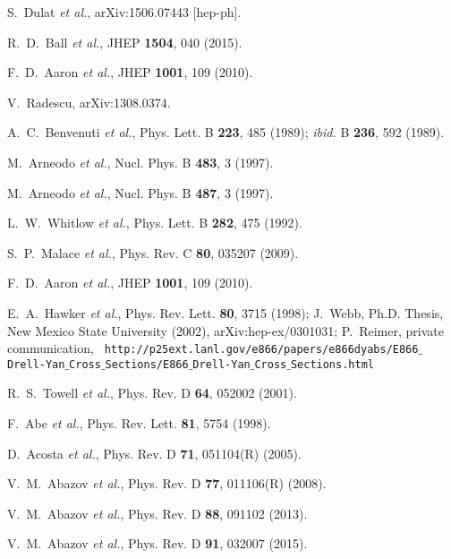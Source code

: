 \documentclass[aps,prd,amsmath,preprint]{revtex4}
\begin{document}
\begin{thebibliography}{99}
S.~Dulat {\it et al.},
arXiv:1506.07443 [hep-ph].

%

R.~D.~Ball {\it et al.},
JHEP {\bf 1504}, 040 (2015).

F.~D.~Aaron {\it et al.},
JHEP {\bf 1001}, 109 (2010).

V.~Radescu, arXiv:1308.0374.

A.~C.~Benvenuti {\it et al.},
Phys. Lett. B {\bf 223}, 485 (1989);
{\it ibid.} B {\bf 236}, 592 (1989).
           
M.~Arneodo {\it et al.},
Nucl. Phys. B {\bf 483}, 3 (1997).

M.~Arneodo {\it et al.},
Nucl. Phys. B {\bf 487}, 3 (1997).

L.~W.~Whitlow {\it et al.},
Phys. Lett. B {\bf 282}, 475 (1992).

S.~P.~Malace {\it et al.},
Phys. Rev. C {\bf 80}, 035207 (2009).

F.~D.~Aaron {\it et al.},
JHEP {\bf 1001}, 109 (2010).

E.~A.~Hawker {\it et al.},
Phys. Rev. Lett. {\bf 80}, 3715 (1998);
%
J.~Webb,
Ph.D. Thesis, New Mexico State University (2002),
arXiv:hep-ex/0301031;
% 
P.~Reimer,
private communication,
%
{\tt
http://p25ext.lanl.gov/e866/papers/e866dyabs/E866$\_$Drell-Yan$\_$Cross$\_$Sections/E866$\_$Drell-Yan$\_$Cross$\_$Sections.html}

R.~S.~Towell {\it et al.},
Phys. Rev. D {\bf 64}, 052002 (2001).

F.~Abe {\it et al.},
Phys. Rev. Lett. {\bf 81}, 5754 (1998).    

D.~Acosta {\it et al.},
Phys. Rev. D {\bf 71}, 051104(R) (2005).

V.~M.~Abazov {\it et al.},
Phys. Rev. D {\bf 77}, 011106(R) (2008).

V.~M.~Abazov {\it et al.},
Phys. Rev. D {\bf 88}, 091102 (2013).

V.~M.~Abazov {\it et al.},
Phys. Rev. D {\bf 91}, 032007 (2015).



\end{thebibliography}
\end{document}
